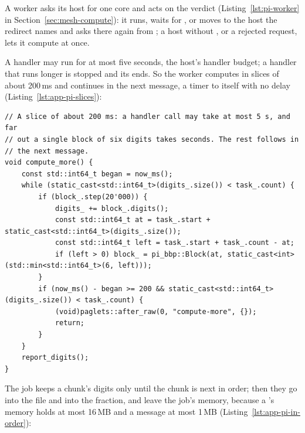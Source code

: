 A worker asks its host for one core and acts on the verdict
(Listing~\ref{lst:pi-worker} in Section~\ref{sec:mesh-compute}): it runs,
waits for , or moves to the host the redirect names
and asks there again from ; a host without
, or a rejected request, lets it compute at once.

A handler may run for at most five seconds, the host's handler budget; a
handler that runs longer is stopped and its \paglet{} ends. So the
worker computes in slices of about 200\,ms and continues in the next
message, a timer to itself with no delay
(Listing~\ref{lst:app-pi-slices}):

\begin{lstlisting}[style=paglets-cpp,caption={Pi: computing in slices between messages \src{cpp/examples/pi/pi.cpp}},label={lst:app-pi-slices}]
// A slice of about 200 ms: a handler call may take at most 5 s, and far
// out a single block of six digits takes seconds. The rest follows in
// the next message.
void compute_more() {
    const std::int64_t began = now_ms();
    while (static_cast<std::int64_t>(digits_.size()) < task_.count) {
        if (block_.step(20'000)) {
            digits_ += block_.digits();
            const std::int64_t at = task_.start + static_cast<std::int64_t>(digits_.size());
            const std::int64_t left = task_.start + task_.count - at;
            if (left > 0) block_ = pi_bbp::Block(at, static_cast<int>(std::min<std::int64_t>(6, left)));
        }
        if (now_ms() - began >= 200 && static_cast<std::int64_t>(digits_.size()) < task_.count) {
            (void)paglets::after_raw(0, "compute-more", {});
            return;
        }
    }
    report_digits();
}
\end{lstlisting}

The job keeps a chunk's digits only until the chunk is next in order;
then they go into the file and into the fraction, and leave the job's
memory, because a \paglet{}'s memory holds at most 16\,MB and a message
at most 1\,MB (Listing~\ref{lst:app-pi-in-order}):

